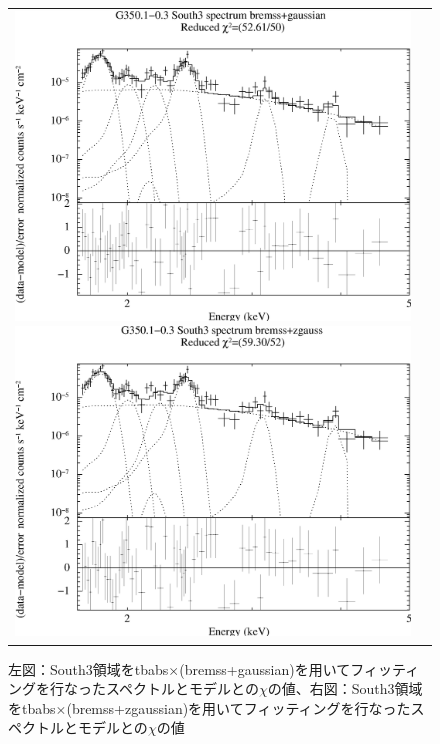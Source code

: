 \documentclass[a4j]{jarticle}%
\begin{document}
\begin{figure}[H]
\begin{center}
\begin{tabular}{cc}

\begin{minipage}{0.5\hsize}
\begin{center}
\includegraphics[scale=0.30]{./ps/South3_bremss+gaussian.eps}
\end{center}
\end{minipage}

\begin{minipage}{0.5\hsize}
\begin{center}
\includegraphics[scale=0.30]{./ps/South3_bremss+zgaussian.eps}
\end{center}
\end{minipage}
\end{tabular}
\caption{左図：South3領域をtbabs$\times$(bremss+gaussian)を用いてフィッティングを行なったスペクトルとモデルとの$\chi$の値、右図：South3領域をtbabs$\times$(bremss+zgaussian)を用いてフィッティングを行なったスペクトルとモデルとの$\chi$の値}
\label{fig:brem_South3}
\end{center}
\end{figure}
\end{document}
